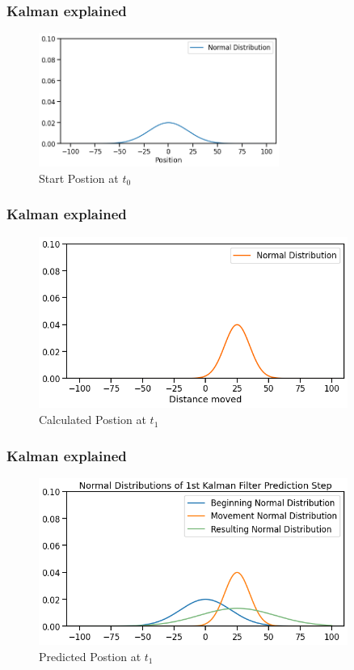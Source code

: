 \documentclass{beamer}
\begin{document}
\begin{frame}
    \frametitle{Kalman explained}
    \begin{figure}
        \centering
        \includegraphics[width=0.7\textwidth]{images/01_normal_distribution.png}
        \caption{Start Postion at \(t_0\)}
    \end{figure}
\end{frame}

\begin{frame}
    \frametitle{Kalman explained}
    \begin{figure}
        \centering
        \includegraphics[width=0.9\textwidth]{images/02_normal_distribution_after_move.png}
        \caption{Calculated Postion at \(t_1\)}
    \end{figure}
\end{frame}

\begin{frame}
    \frametitle{Kalman explained}
    \begin{figure}
        \centering
        \includegraphics[width=0.9\textwidth]{images/03_first_prediction.png}
        \caption{Predicted Postion at \(t_1\)}
    \end{figure}
\end{frame}
\end{document}
